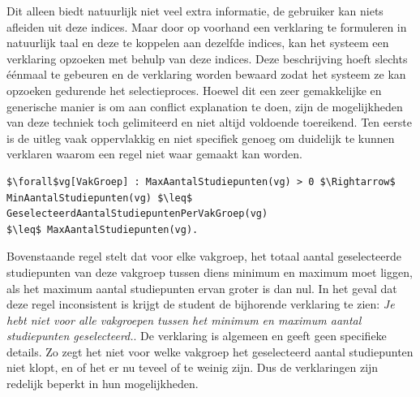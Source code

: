 Dit alleen biedt natuurlijk niet veel extra informatie, de gebruiker kan niets afleiden uit deze indices. Maar door op voorhand een verklaring te formuleren in natuurlijk taal en deze te koppelen aan dezelfde indices, kan het systeem een verklaring opzoeken met behulp van deze indices. Deze beschrijving hoeft slechts \'{e}\'{e}nmaal te gebeuren en de verklaring worden bewaard zodat het systeem ze kan opzoeken gedurende het selectieproces. Hoewel dit een zeer gemakkelijke en generische manier is om aan conflict explanation te doen, zijn de mogelijkheden van deze techniek toch gelimiteerd en niet altijd voldoende toereikend. Ten eerste is de uitleg vaak oppervlakkig en niet specifiek genoeg om duidelijk te kunnen verklaren waarom een regel niet waar gemaakt kan worden. 

\lstset{basicstyle=\scriptsize}
\begin{lstlisting}[mathescape, caption=Reified constraint Shortcomings, frame=single]
$\forall$vg[VakGroep] : MaxAantalStudiepunten(vg) > 0 $\Rightarrow$ 
MinAantalStudiepunten(vg) $\leq$ GeselecteerdAantalStudiepuntenPerVakGroep(vg) 
$\leq$ MaxAantalStudiepunten(vg).
\end{lstlisting}

Bovenstaande regel stelt dat voor elke vakgroep, het totaal aantal geselecteerde studiepunten van deze vakgroep tussen diens minimum en maximum moet liggen, als het maximum aantal studiepunten ervan groter is dan nul. In het geval dat deze regel inconsistent is krijgt de student de bijhorende verklaring te zien: \textit{Je hebt niet voor alle vakgroepen tussen het minimum en maximum aantal studiepunten geselecteerd.}. De verklaring is algemeen en geeft geen specifieke details. Zo zegt het niet voor welke vakgroep het geselecteerd aantal studiepunten niet klopt, en of het er nu teveel of te weinig zijn. Dus de verklaringen zijn redelijk beperkt in hun mogelijkheden. 

